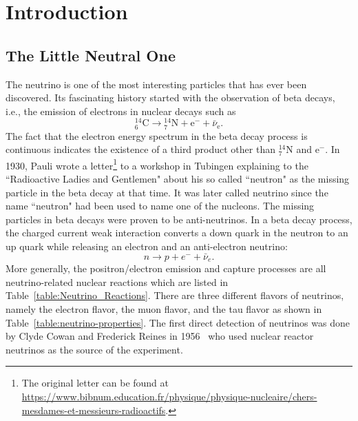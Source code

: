 \chapter{Introduction}
\label{introduction}

\section{The Little Neutral One}

The neutrino is one of the most interesting particles that has ever been discovered. Its fascinating history started with the observation of beta decays, i.e., the emission of electrons in nuclear decays such as
\begin{equation*}
{}^{14}_{6} \mathrm C \to {}^{14}_{7}\mathrm N + \mathrm e^{-} + \bar\nu_{\mathrm e}.
\end{equation*}
The fact that the electron energy spectrum in the beta decay process is continuous indicates the existence of a third product other than ${}^{14}_{7}\mathrm N$ and $\mathrm e^-$. In 1930, Pauli wrote a letter\footnote{The original letter can be found at \url{https://www.bibnum.education.fr/physique/physique-nucleaire/chers-mesdames-et-messieurs-radioactifs}.} to a workshop in Tubingen explaining to the ``Radioactive Ladies and Gentlemen" about his so called ``neutron" as the missing particle in the beta decay at that time. It was later called neutrino since the name ``neutron" had been used to name one of the nucleons. The missing particles in beta decays were proven to be anti-neutrinos. In a beta decay process, the charged current weak interaction converts a down quark in the neutron to an up quark while releasing an electron and an anti-electron neutrino:
\begin{equation}
n\to p + e^- + \bar \nu_e .
\end{equation}
More generally, the positron/electron emission and capture processes are all neutrino-related nuclear reactions which are listed in Table~\ref{table:Neutrino_Reactions}. There are three different flavors of neutrinos, namely the electron flavor, the muon flavor, and the tau flavor as shown in Table~\ref{table:neutrino-properties}. The first direct detection of neutrinos was done by Clyde Cowan and Frederick Reines in 1956~\cite{Cowan1956} who used nuclear reactor neutrinos as the source of the experiment.

